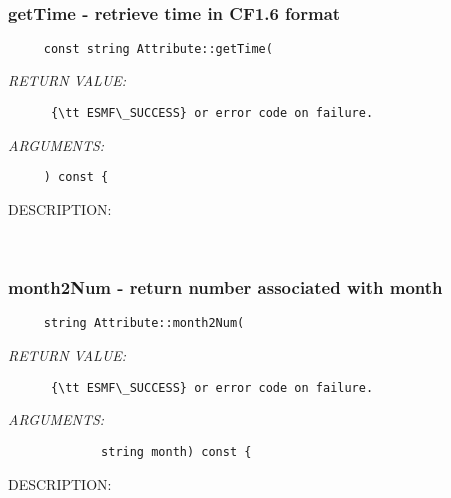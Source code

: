 \mbox{}\hrulefill\
 
\subsubsection [getTime] {getTime - retrieve time in CF1.6 format}


  
\begin{verbatim}     const string Attribute::getTime(\end{verbatim}{\em RETURN VALUE:}
\begin{verbatim}      {\tt ESMF\_SUCCESS} or error code on failure.\end{verbatim}{\em ARGUMENTS:}
\begin{verbatim}     ) const {\end{verbatim}
{\sf DESCRIPTION:\\ }


  
   
 
\mbox{}\hrulefill\
 
\subsubsection [month2Num] {month2Num - return number associated with month}


  
\begin{verbatim}     string Attribute::month2Num(\end{verbatim}{\em RETURN VALUE:}
\begin{verbatim}      {\tt ESMF\_SUCCESS} or error code on failure.\end{verbatim}{\em ARGUMENTS:}
\begin{verbatim}             string month) const {\end{verbatim}
{\sf DESCRIPTION:\\ }


  
  
\setlength{\parskip}{\oldparskip}
\setlength{\parindent}{\oldparindent}
\setlength{\baselineskip}{\oldbaselineskip}
